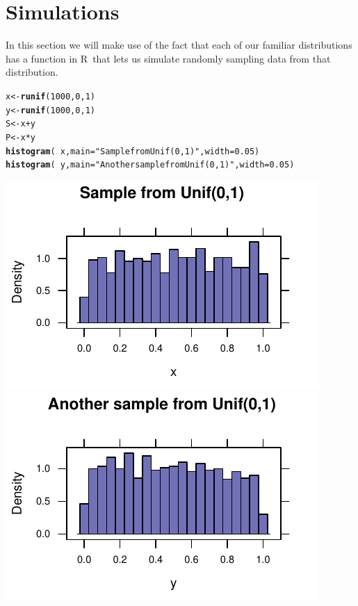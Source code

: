 \documentclass[twoside]{book}\usepackage[]{graphicx}\usepackage[]{xcolor}
\makeatletter
\def\maxwidth{ %
  \ifdim\Gin@nat@width>\linewidth
    \linewidth
  \else
    \Gin@nat@width
  \fi
}
\newcommand{\hlnum}[1]{\textcolor[rgb]{0.686,0.059,0.569}{#1}}%
\newcommand{\hlstr}[1]{\textcolor[rgb]{0.192,0.494,0.8}{#1}}%
\newcommand{\hlopt}[1]{\textcolor[rgb]{0,0,0}{#1}}%
\newcommand{\hlstd}[1]{\textcolor[rgb]{0.345,0.345,0.345}{#1}}%
\newcommand{\hlkwb}[1]{\textcolor[rgb]{0.69,0.353,0.396}{#1}}%
\newcommand{\hlkwc}[1]{\textcolor[rgb]{0.333,0.667,0.333}{#1}}%
\newcommand{\hlkwd}[1]{\textcolor[rgb]{0.737,0.353,0.396}{\textbf{#1}}}%
\newenvironment{kframe}{%
 \def\at@end@of@kframe{}%
 \ifinner\ifhmode%
  \def\at@end@of@kframe{\end{minipage}}%
  \begin{minipage}{\columnwidth}%
 \fi\fi%
 \def\FrameCommand##1{\hskip\@totalleftmargin \hskip-\fboxsep
 \colorbox{shadecolor}{##1}\hskip-\fboxsep
     \hskip-\linewidth \hskip-\@totalleftmargin \hskip\columnwidth}%
 \MakeFramed {\advance\hsize-\width
   \@totalleftmargin\z@ \linewidth\hsize
   \@setminipage}}%
 {\par\unskip\endMakeFramed%
 \at@end@of@kframe}
\newenvironment{knitrout}{}{} %
\def\R{{\sf R}}
\makeatother
\begin{document}
\section{Simulations}

In this section we will make use of the fact that each of our familiar distributions
has a function in \R\ that lets us simulate randomly sampling data from that distribution.
\begin{knitrout}
\color{fgcolor}\begin{kframe}
\begin{alltt}
\hlstd{x} \hlkwb{<-} \hlkwd{runif}\hlstd{(}\hlnum{1000}\hlstd{,} \hlnum{0}\hlstd{,} \hlnum{1}\hlstd{)}
\hlstd{y} \hlkwb{<-} \hlkwd{runif}\hlstd{(}\hlnum{1000}\hlstd{,} \hlnum{0}\hlstd{,} \hlnum{1}\hlstd{)}
\hlstd{S} \hlkwb{<-} \hlstd{x} \hlopt{+} \hlstd{y}
\hlstd{P} \hlkwb{<-} \hlstd{x} \hlopt{*} \hlstd{y}
\hlkwd{histogram}\hlstd{(}\hlopt{~}\hlstd{x,} \hlkwc{main} \hlstd{=} \hlstr{"Sample from Unif(0,1)"}\hlstd{,} \hlkwc{width} \hlstd{=} \hlnum{0.05}\hlstd{)}
\hlkwd{histogram}\hlstd{(}\hlopt{~}\hlstd{y,} \hlkwc{main} \hlstd{=} \hlstr{"Another sample from Unif(0,1)"}\hlstd{,} \hlkwc{width} \hlstd{=} \hlnum{0.05}\hlstd{)}
\end{alltt}
\end{kframe}

{\centering \includegraphics[width=\maxwidth]{figures/fig-runif-1} 
\includegraphics[width=\maxwidth]{figures/fig-runif-2} 

}



\end{knitrout}
\end{document}
